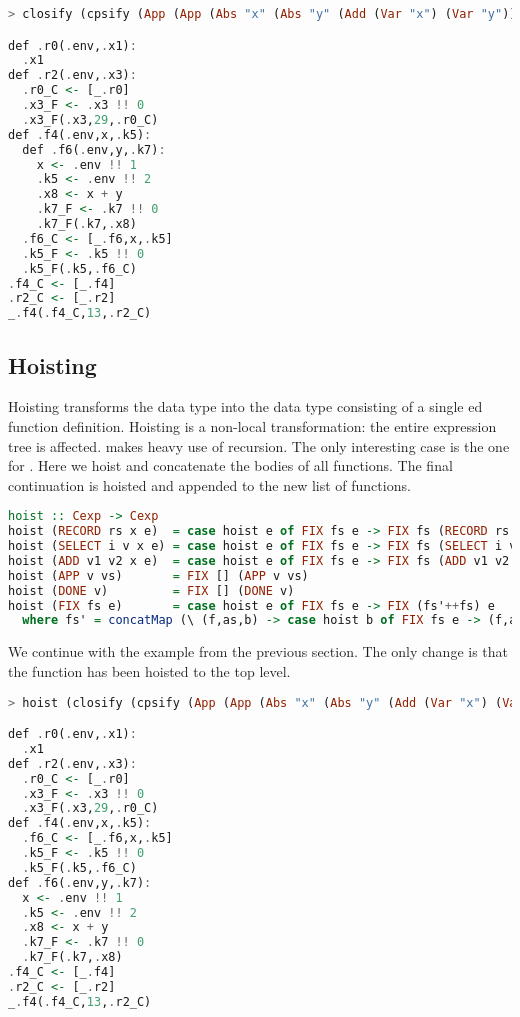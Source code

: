 {\begin{lstlisting}[language=Haskell]
> closify (cpsify (App (App (Abs "x" (Abs "y" (Add (Var "x") (Var "y")))) (Num 13)) (Num 29)))

def .r0(.env,.x1):
  .x1
def .r2(.env,.x3):
  .r0_C <- [_.r0]
  .x3_F <- .x3 !! 0
  .x3_F(.x3,29,.r0_C)
def .f4(.env,x,.k5):
  def .f6(.env,y,.k7):
    x <- .env !! 1
    .k5 <- .env !! 2
    .x8 <- x + y
    .k7_F <- .k7 !! 0
    .k7_F(.k7,.x8)
  .f6_C <- [_.f6,x,.k5]
  .k5_F <- .k5 !! 0
  .k5_F(.k5,.f6_C)
.f4_C <- [_.f4]
.r2_C <- [_.r2]
_.f4(.f4_C,13,.r2_C)
\end{lstlisting}

\subsection{\label{subsection:hoist}Hoisting}
Hoisting transforms the  data type into the  data type consisting of a single ed function definition. Hoisting is a non-local transformation: the entire expression tree is affected.  makes heavy use of recursion. The only interesting case is the one for . Here we hoist and concatenate the bodies of all functions. The final continuation  is hoisted and appended to the new list of functions.

\begin{lstlisting}[language=Haskell]
hoist :: Cexp -> Cexp
hoist (RECORD rs x e)  = case hoist e of FIX fs e -> FIX fs (RECORD rs x e)
hoist (SELECT i v x e) = case hoist e of FIX fs e -> FIX fs (SELECT i v x e)
hoist (ADD v1 v2 x e)  = case hoist e of FIX fs e -> FIX fs (ADD v1 v2 x e)
hoist (APP v vs)       = FIX [] (APP v vs)
hoist (DONE v)         = FIX [] (DONE v)               
hoist (FIX fs e)       = case hoist e of FIX fs e -> FIX (fs'++fs) e
  where fs' = concatMap (\ (f,as,b) -> case hoist b of FIX fs e -> (f,as,e) : fs) fs
\end{lstlisting}

We continue with the example from the previous section. The only change is that the function  has been hoisted to the top level.

\begin{lstlisting}[language=Haskell]
> hoist (closify (cpsify (App (App (Abs "x" (Abs "y" (Add (Var "x") (Var "y")))) (Num 13)) (Num 29))))

def .r0(.env,.x1):
  .x1
def .r2(.env,.x3):
  .r0_C <- [_.r0]
  .x3_F <- .x3 !! 0
  .x3_F(.x3,29,.r0_C)
def .f4(.env,x,.k5):
  .f6_C <- [_.f6,x,.k5]
  .k5_F <- .k5 !! 0
  .k5_F(.k5,.f6_C)
def .f6(.env,y,.k7):
  x <- .env !! 1
  .k5 <- .env !! 2
  .x8 <- x + y
  .k7_F <- .k7 !! 0
  .k7_F(.k7,.x8)
.f4_C <- [_.f4]
.r2_C <- [_.r2]
_.f4(.f4_C,13,.r2_C)
\end{lstlisting}

}
